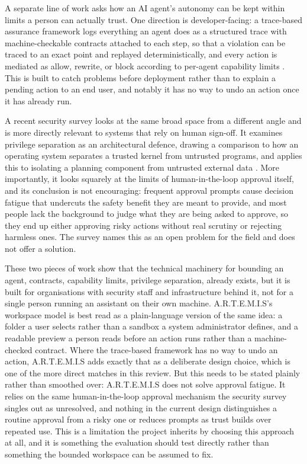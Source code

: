 \documentclass[11pt,a4paper]{report}
\newcommand{\artemis}{A.R.T.E.M.I.S}
\begin{document}
A separate line of work asks how an AI agent's autonomy can be kept
within limits a person can actually trust. One direction is
developer-facing: a trace-based assurance framework logs everything an
agent does as a structured trace with machine-checkable contracts
attached to each step, so that a violation can be traced to an exact
point and replayed deterministically, and every action is mediated as
allow, rewrite, or block according to per-agent capability limits
\autocite{paduraru2026tracebased}. This is built to catch problems
before deployment rather than to explain a pending action to an end
user, and notably it has no way to undo an action once it has already
run.

A recent security survey looks at the same broad space from a
different angle and is more directly relevant to systems that rely on
human sign-off. It examines privilege separation as an architectural
defence, drawing a comparison to how an operating system separates a
trusted kernel from untrusted programs, and applies this to isolating
a planning component from untrusted external data
\autocite{kim2026attackdefense}. More importantly, it looks squarely
at the limits of human-in-the-loop approval itself, and its conclusion
is not encouraging: frequent approval prompts cause decision fatigue
that undercuts the safety benefit they are meant to provide, and most
people lack the background to judge what they are being asked to
approve, so they end up either approving risky actions without real
scrutiny or rejecting harmless ones. The survey names this as an open
problem for the field and does not offer a solution.

These two pieces of work show that the technical machinery for
bounding an agent, contracts, capability limits, privilege separation,
already exists, but it is built for organisations with security staff
and infrastructure behind it, not for a single person running an
assistant on their own machine. \artemis{}'s workspace model is best
read as a plain-language version of the same idea: a folder a user
selects rather than a sandbox a system administrator defines, and a
readable preview a person reads before an action runs rather than a
machine-checked contract. Where the trace-based framework has no way
to undo an action, \artemis{} adds exactly that as a deliberate design
choice, which is one of the more direct matches in this review. But
this needs to be stated plainly rather than smoothed over: \artemis{}
does not solve approval fatigue. It relies on the same human-in-the-loop
approval mechanism the security survey singles out as unresolved, and
nothing in the current design distinguishes a routine approval from a
risky one or reduces prompts as trust builds over repeated use. This
is a limitation the project inherits by choosing this approach at
all, and it is something the evaluation should test directly rather
than something the bounded workspace can be assumed to fix.
\end{document}
